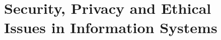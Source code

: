 \documentclass[\main/notes.tex]{subfiles}
\begin{document}
	\setcounter{chapter}{12}
	\chapter{Security, Privacy and Ethical Issues in Information Systems}
	\vbox{}
\end{document}
